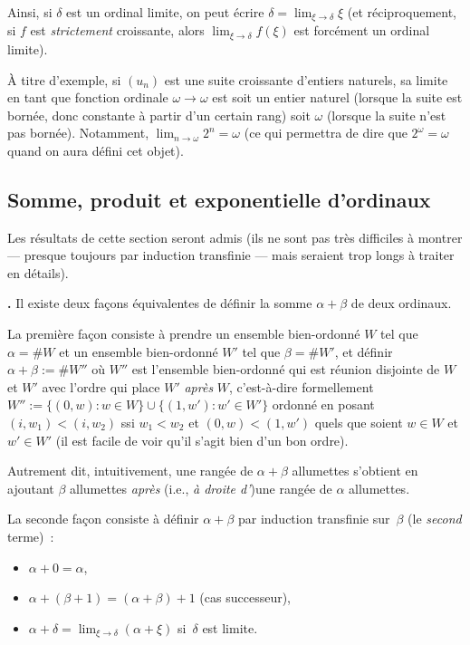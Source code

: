 \documentclass[12pt,a4paper]{article}
\theoremstyle{definition}
\newcommand\thingy{%
\refstepcounter{comcnt}\smallskip\noindent\textbf{\thecomcnt.} }
\begin{document}
Ainsi, si $\delta$ est un ordinal limite, on peut écrire $\delta =
\lim_{\xi\to\delta} \xi$ (et réciproquement, si $f$ est
\emph{strictement} croissante, alors $\lim_{\xi\to\delta} f(\xi)$ est
forcément un ordinal limite).

À titre d'exemple, si $(u_n)$ est une suite croissante d'entiers
naturels, sa limite en tant que fonction ordinale $\omega \to \omega$
est soit un entier naturel (lorsque la suite est bornée, donc
constante à partir d'un certain rang) soit $\omega$ (lorsque la suite
n'est pas bornée).  Notamment, $\lim_{n\to\omega} 2^n = \omega$ (ce
qui permettra de dire que $2^\omega = \omega$ quand on aura défini cet
objet).


\subsection{Somme, produit et exponentielle d'ordinaux}

Les résultats de cette section seront admis (ils ne sont pas très
difficiles à montrer — presque toujours par induction transfinie —
mais seraient trop longs à traiter en détails).

\thingy\label{definition-sum-of-ordinals} Il existe deux façons
équivalentes de définir la somme $\alpha+\beta$ de deux ordinaux.

La première façon consiste à prendre un ensemble bien-ordonné $W$ tel
que $\alpha = \#W$ et un ensemble bien-ordonné $W'$ tel que $\beta =
\#W'$, et définir $\alpha + \beta := \#W''$ où $W''$ est l'ensemble
bien-ordonné qui est réunion disjointe de $W$ et $W'$ avec l'ordre qui
place $W'$ \emph{après} $W$, c'est-à-dire formellement $W'' := \{(0,w)
: w\in W\} \cup \{(1,w') : w'\in W'\}$ ordonné en posant $(i,w_1) <
(i,w_2)$ ssi $w_1 < w_2$ et $(0,w) < (1,w')$ quels que soient $w\in W$
et $w' \in W'$ (il est facile de voir qu'il s'agit bien d'un bon
ordre).

Autrement dit, intuitivement, une rangée de $\alpha+\beta$ allumettes
s'obtient en ajoutant $\beta$ allumettes \emph{après} (i.e., \emph{à
  droite d'})une rangée de $\alpha$ allumettes.

La seconde façon consiste à définir $\alpha+\beta$ par induction
transfinie sur $\beta$ (le \emph{second} terme) :
\begin{itemize}
\item $\alpha + 0 = \alpha$,
\item $\alpha + (\beta+1) = (\alpha+\beta) + 1$ (cas successeur),
\item $\alpha + \delta = \lim_{\xi\to\delta} (\alpha+\xi)$ si $\delta$
  est limite.
\end{itemize}
\end{document}
